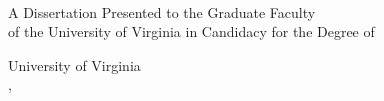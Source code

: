  \let\Year\@degreeyear
{}
\makeatother




\makeatletter
\def\maketitle{\begin{titlepage}
\doublespacing
\vspace{0.8in}
\large
{\LARGE\bf \@title \par}
\@author \\
\@prevdegrees
\par
A Dissertation Presented to the Graduate Faculty \\
of the University of Virginia in Candidacy for the Degree of \\
\@degree
\par
\@department
\par
University of Virginia \\
\@degreemonth, \@degreeyear
\vspace{0.8in}
\end{titlepage}}
\makeatother
\maketitle

